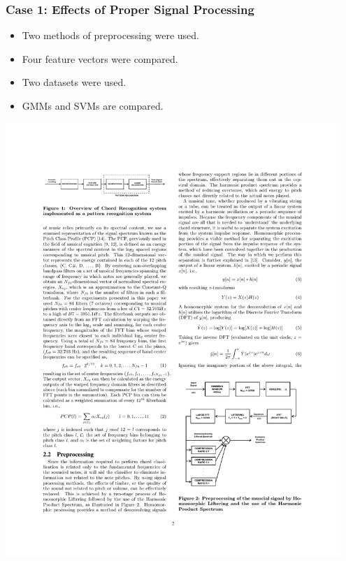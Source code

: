 \documentclass{beamer}
\begin{document}
\begin{frame}
  \frametitle{Case 1: Effects of Proper Signal Processing}
	\begin{itemize}
		\item Two methods of preprocessing were used.
		\item Four feature vectors were compared.
		\item Two datasets were used.
		\item GMMs and SVMs are compared.
	\end{itemize}
 
 \includegraphics[width=0.95\textwidth]{fig2.pdf}
\end{frame}
\end{document}
